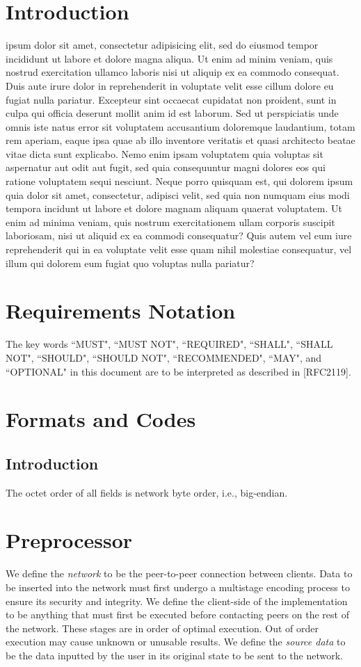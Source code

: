 \documentclass[journal]{IEEEtran}
\begin{document}
\section{Introduction}
 ipsum dolor sit amet, consectetur adipisicing elit, sed do eiusmod tempor incididunt ut labore et dolore magna aliqua. Ut enim ad minim veniam, quis nostrud exercitation ullamco laboris nisi ut aliquip ex ea commodo consequat. Duis aute irure dolor in reprehenderit in voluptate velit esse cillum dolore eu fugiat nulla pariatur. Excepteur sint occaecat cupidatat non proident, sunt in culpa qui officia deserunt mollit anim id est laborum. Sed ut perspiciatis unde omnis iste natus error sit voluptatem accusantium doloremque laudantium, totam rem aperiam, eaque ipsa quae ab illo inventore veritatis et quasi architecto beatae vitae dicta sunt explicabo. Nemo enim ipsam voluptatem quia voluptas sit aspernatur aut odit aut fugit, sed quia consequuntur magni dolores eos qui ratione voluptatem sequi nesciunt. Neque porro quisquam est, qui dolorem ipsum quia dolor sit amet, consectetur, adipisci velit, sed quia non numquam eius modi tempora incidunt ut labore et dolore magnam aliquam quaerat voluptatem. Ut enim ad minima veniam, quis nostrum exercitationem ullam corporis suscipit laboriosam, nisi ut aliquid ex ea commodi consequatur? Quis autem vel eum iure reprehenderit qui in ea voluptate velit esse quam nihil molestiae consequatur, vel illum qui dolorem eum fugiat quo voluptas nulla pariatur?

\section{Requirements Notation}
The key words ``MUST", ``MUST NOT", ``REQUIRED", ``SHALL", ``SHALL NOT", ``SHOULD", ``SHOULD NOT", ``RECOMMENDED", ``MAY", and ``OPTIONAL" in this document are to be interpreted as described in [RFC2119].

\section{Formats and Codes}

\subsection{Introduction}
The octet order of all fields is network byte order, i.e., big-endian.


\section{Preprocessor}
We define the \textit{network} to be the peer-to-peer connection between clients. Data to be inserted into the network must first undergo a multistage encoding process to ensure its security and integrity. We define the client-side of the implementation to be anything that must first be executed before contacting peers on the rest of the network. These stages are in order of optimal execution. Out of order execution may cause unknown or unusable results. We define the \textit{source data} to be the data inputted by the user in its original state to be sent to the network.
\end{document}
